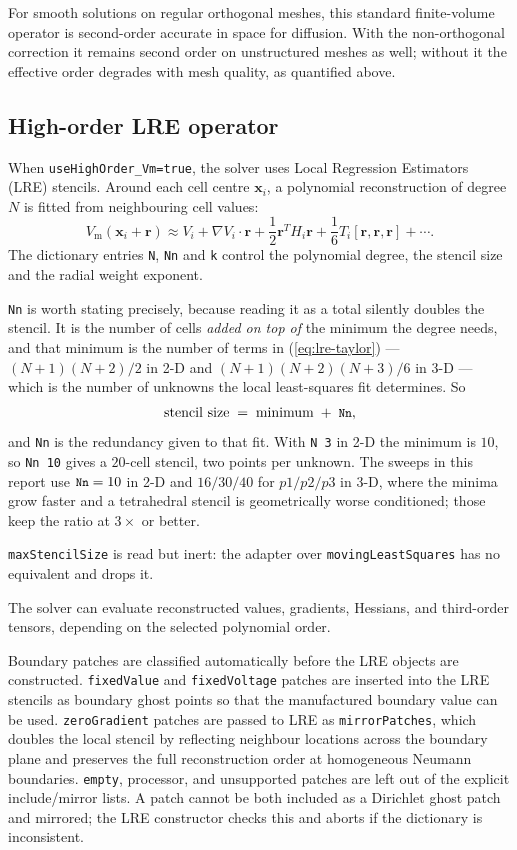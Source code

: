 \documentclass[11pt,a4paper]{article}
\newcommand{\code}[1]{\texttt{\small #1}}
\newcommand{\Vm}{V_{\text{m}}}
\newcommand{\grad}{\nabla}
\begin{document}
For smooth solutions on regular orthogonal meshes, this standard finite-volume
operator is second-order accurate in space for diffusion. With the non-orthogonal
correction it remains second order on unstructured meshes as well; without it the
effective order degrades with mesh quality, as quantified above.

\subsection{High-order LRE operator}
\label{sec:lre}

When \code{useHighOrder\_Vm=true}, the solver uses Local
Regression Estimators (LRE) stencils. Around each cell centre $\mathbf{x}_i$, a polynomial
reconstruction of degree $N$ is fitted from neighbouring cell values:
\begin{equation}
  \Vm(\mathbf{x}_i+\mathbf{r})
  \approx
  V_i
  + \grad V_i\cdot\mathbf{r}
  + \frac{1}{2}\mathbf{r}^{T}H_i\mathbf{r}
  + \frac{1}{6}T_i[\mathbf{r},\mathbf{r},\mathbf{r}]
  + \cdots.
  \label{eq:lre-taylor}
\end{equation}
The dictionary entries \code{N}, \code{Nn} and \code{k} control the polynomial
degree, the stencil size and the radial weight exponent.

\code{Nn} is worth stating precisely, because reading it as a total silently
doubles the stencil. It is the number of cells \emph{added on top of} the minimum
the degree needs, and that minimum is the number of terms in
(\ref{eq:lre-taylor}) --- $(N{+}1)(N{+}2)/2$ in 2-D and
$(N{+}1)(N{+}2)(N{+}3)/6$ in 3-D --- which is the number of unknowns the local
least-squares fit determines. So
%
\[ \text{stencil size} \;=\; \text{minimum} \;+\; \code{Nn}, \]
%
and \code{Nn} is the redundancy given to that fit. With \code{N 3} in 2-D the
minimum is $10$, so \code{Nn 10} gives a $20$-cell stencil, two points per
unknown. The sweeps in this report use $\code{Nn}=10$ in 2-D and $16/30/40$ for
$p1/p2/p3$ in 3-D, where the minima grow faster and a tetrahedral stencil is
geometrically worse conditioned; those keep the ratio at $3\times$ or better.

\code{maxStencilSize} is read but inert: the adapter over
\code{movingLeastSquares} has no equivalent and drops it.

The solver can evaluate reconstructed values, gradients, Hessians, and
third-order tensors, depending on the selected polynomial order.

Boundary patches are classified automatically before the LRE objects are
constructed. \code{fixedValue} and \code{fixedVoltage} patches are inserted into
the LRE stencils as boundary ghost points so that the manufactured boundary
value can be used. \code{zeroGradient} patches are passed to LRE as
\code{mirrorPatches}, which doubles the local stencil by reflecting neighbour
locations across the boundary plane and preserves the full reconstruction order
at homogeneous Neumann boundaries. \code{empty}, processor, and unsupported
patches are left out of the explicit include/mirror lists. A patch cannot be
both included as a Dirichlet ghost patch and mirrored; the LRE constructor
checks this and aborts if the dictionary is inconsistent.
\end{document}
